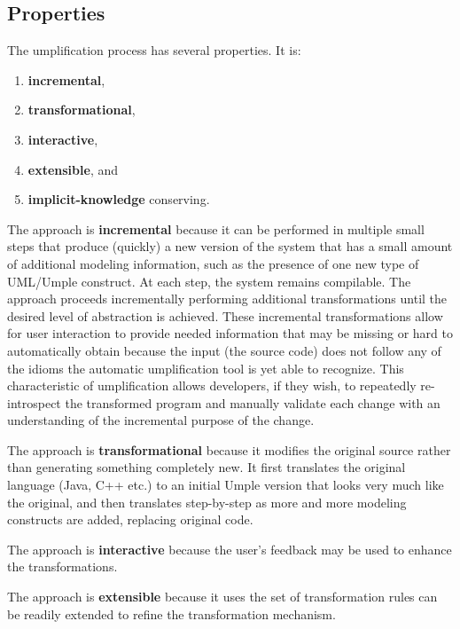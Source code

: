 
\subsection{Properties}

The umplification process has several properties. It is:
\begin{enumerate}
 \item \textbf{incremental}, 
 \item \textbf{transformational},
 \item \textbf{interactive},  
 \item \textbf{extensible}, and
 \item \textbf{implicit-knowledge} conserving. 
\end{enumerate}

The approach is \textbf{incremental} because it can be performed in multiple small steps that produce (quickly) a new version of the system that has a small amount of additional modeling information, such as the presence of one new type of UML/Umple construct. At each step, the system remains compilable. The approach proceeds incrementally performing additional transformations until the desired level of abstraction is achieved.	These incremental transformations allow for user interaction to provide needed information that may be missing or hard to automatically obtain because the input (the source code) does not follow any of the idioms the automatic umplification tool is yet able to recognize. This characteristic of umplification allows developers, if they wish, to repeatedly re-introspect the transformed program and manually validate each change with an understanding of the incremental purpose of the change.

The approach is \textbf{transformational} because it modifies the original source rather than generating something completely new. It first translates the original language (Java, C++ etc.) to an initial Umple version that looks very much like the original, and then translates step-by-step as more and more modeling constructs are added, replacing original code.

The approach is \textbf{interactive} because the user's feedback may be used to enhance the transformations.

The approach is \textbf{extensible} because it uses the set of transformation rules can be readily extended to refine the transformation mechanism. 

